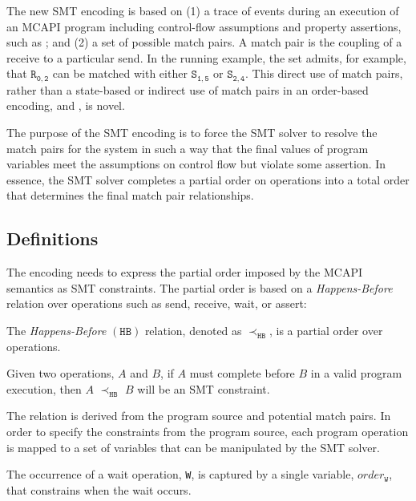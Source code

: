 The new SMT encoding is based on (1) a trace of events during an
execution of an MCAPI program including control-flow assumptions and
property assertions, such as ; and (2) a set of
possible match pairs. A match pair is the coupling of a receive to a
particular send.  In the running example, the set admits, for example,
that $\mathtt{R_{0,2}}$ can be matched with either $\mathtt{S_{1,5}}$
or $\mathtt{S_{2,4}}$. This direct use of match pairs, rather than a
state-based or indirect use of match pairs in an order-based
encoding, \cite{elwakil:padtad10} and \cite{elwakil:atva10}, is novel.

The purpose of the SMT encoding is to force the SMT solver to resolve
the match pairs for the system in such a way that the final values of
program variables meet the assumptions on control flow but violate
some assertion. In essence, the SMT solver completes a partial order
on operations into a total order that determines the final match pair
relationships.

\subsection{Definitions} \label{sec:smt-defns}

The encoding needs to express the partial order imposed by the MCAPI
semantics as SMT constraints. The partial order is based on a
\emph{Happens-Before} relation over operations such as send, receive,
wait, or assert:

\begin{definition}
The \emph{Happens-Before} $(\mathtt{HB})$ relation, denoted as
$\mathrm{\prec_\mathtt{HB}}$, is a partial order over operations.
\label{def:hb}
\end{definition}

Given two operations, $A$ and $B$, if $A$ must complete before $B$ in a
valid program execution, then $A$ $\mathrm{\prec_{\mathtt{HB}}}$ $B$
will be an SMT constraint.

The relation is derived from the program source and potential match pairs. In
order to specify the constraints from the program source, each program operation is mapped to a set of variables that can be manipulated by the SMT solver.

\begin{definition}[Wait] \label{def:event}
The occurrence of a wait operation, \texttt{W}, is captured by a
single variable, $\mathit{order}_\mathtt{W}$, that constrains when
the wait occurs.
\end{definition}

